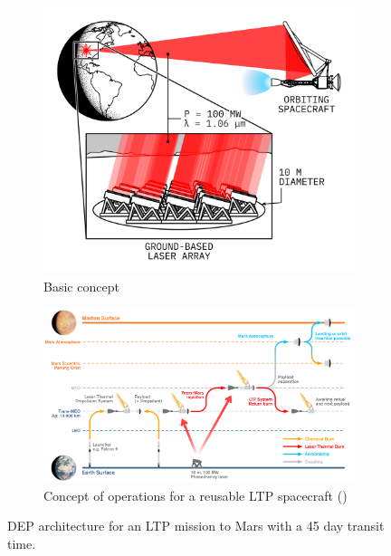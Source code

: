    \begin{figure}[h]
        \centering
        \begin{subfigure}[t]{\textwidth}
            \centering
            \includegraphics[]{assets/2 background/ltp_architecture.png}
            \caption{Basic concept}
            \label{fig:ltp_architecture_basic}
        \end{subfigure}
        \begin{subfigure}[t]{\textwidth}
            \centering
            \includegraphics[width=\textwidth]{assets/1 intro/conops.pdf}
            \caption{Concept of operations for a reusable LTP spacecraft (\textcite{duplayDesignRapidTransit2022})}
            \label{fig:ltp_architecture_conops}
        \end{subfigure}
        \caption{DEP architecture for an LTP mission to Mars with a 45 day transit time.}
        \label{fig:ltp_architecture}
    \end{figure}